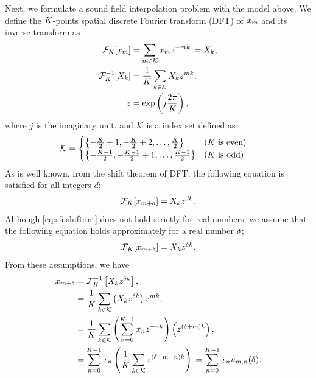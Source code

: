 \documentclass[sip,biber]{now-journal}
\newcommand{\todo}[1]{\textcolor{red}{#1}}
\begin{document}
Next, we formulate a sound field interpolation problem with the model above.
We define the $K$-points spatial discrete Fourier transform (DFT) of $x _{m}$ and its inverse transform as
\begin{align}
  \mathcal{F} _{K} [x _{m}] &= \sum _{m \in \mathcal{K}} x _{m} z ^{-mk} \coloneqq X _{k},\\
  \mathcal{F} _{K} ^{-1} [X _{k}] &= \frac{1}{K} \sum _{k \in \mathcal{K}} X _{k} z ^{mk}, \\
  z &= \exp \left(j\frac{2\pi}{K}\right),
\end{align}
where $j$ is the imaginary unit,
and $\mathcal{K}$ is a index set defined as%
\begin{align}
  \mathcal{K} &=
  \begin{cases}
    \left\{-\frac{K}{2} + 1, -\frac{K}{2} + 2, \dots, \frac{K}{2}\right\} & \text{($K$ is even)} \\
    \left\{-\frac{K - 1}{2}, -\frac{K - 1}{2} + 1, \dots, \frac{K - 1}{2}\right\} & \text{($K$ is odd)}
  \end{cases}
\end{align}
As is well known, from the shift theorem of DFT, the following equation is satisfied for all integers $d$;
\begin{equation}
  \dft _{\Src} [\sfcma _{\mic + d}] = \Sfcma _{\src} \twid ^{d \src}.%
  \label{eq:sfi:shift:int}
\end{equation}
Although \eqref{eq:sfi:shift:int} does not hold strictly for real numbers, we assume that the following equation holds approximately for a real number $\delta$;
\begin{equation}
  \dft _{\Src} [\sfcma _{\mic + \rotSmpl}] = \Sfcma _{\src} \twid ^{\rotSmpl \src}.%
  \label{eq:sfi:shift:dft}
\end{equation}
From these assumptions, we have
\begin{align}
  x _{m + \delta} &= \mathcal{F} _{K} ^{-1} \left[X _{k} z ^{\delta k}\right], \\
                            &= \frac{1}{K} \sum _{k \in \mathcal{K}} \left(X _{k}z ^{\delta k} \right) z ^{mk}, \\
                            &= \frac{1}{K} \sum _{k \in \mathcal{K}} \left(\sum _{n=0} ^{K - 1} x _{n} z ^{-nk}\right) \left( z ^{(\delta + m)k} \right), \\
                            &= \sum _{n = 0} ^{K - 1} x _{n} \left( \frac{1}{K} \sum _{k \in \mathcal{K}} z ^{(\delta + m - n)k} \right)
                            \coloneqq \sum _{n = 0} ^{K - 1} x _{n} u _{m, n}(\delta) \label{eq:sfi:elem}.
\end{align}
\end{document}
